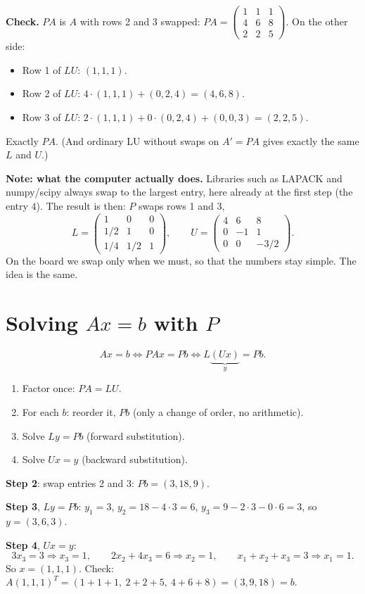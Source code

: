 \textbf{Check.} $PA$ is $A$ with rows 2 and 3 swapped: $PA=\begin{pmatrix}1&1&1\\4&6&8\\2&2&5\end{pmatrix}$. On the other side:
\begin{itemize}
  \item Row 1 of $LU$: $(1,1,1)$.
  \item Row 2 of $LU$: $4\cdot(1,1,1)+(0,2,4) = (4,6,8)$.
  \item Row 3 of $LU$: $2\cdot(1,1,1)+0\cdot(0,2,4)+(0,0,3) = (2,2,5)$.
\end{itemize}
Exactly $PA$. (And ordinary LU without swaps on $A'=PA$ gives exactly the same $L$ and $U$.)

\begin{plainbox}
\textbf{Note: what the computer actually does.} Libraries such as LAPACK and numpy/scipy always swap to the largest entry, here already at the first step
(the entry $4$). The result is then: $P$ swaps rows 1 and 3,
\[ L=\begin{pmatrix}1&0&0\\1/2&1&0\\1/4&1/2&1\end{pmatrix},\qquad U=\begin{pmatrix}4&6&8\\0&-1&1\\0&0&-3/2\end{pmatrix}. \]
On the board we swap only when we must, so that the numbers stay simple. The idea is the same.
\end{plainbox}

\section{Solving $Ax=b$ with $P$}

\[ Ax=b\iff PAx=Pb\iff L\underbrace{(Ux)}_{y}=Pb. \]
\begin{enumerate}
  \item Factor once: $PA=LU$.
  \item For each $b$: reorder it, $Pb$ (only a change of order, no arithmetic).
  \item Solve $Ly=Pb$ (forward substitution).
  \item Solve $Ux=y$ (backward substitution).
\end{enumerate}

\begin{example}[$b=(3,9,18)$]
\textbf{Step 2}: swap entries 2 and 3: $Pb=(3,18,9)$.

\textbf{Step 3}, $Ly=Pb$: $y_1=3$, $y_2=18-4\cdot3=6$, $y_3=9-2\cdot3-0\cdot6=3$, so $y=(3,6,3)$.

\textbf{Step 4}, $Ux=y$:
\[ 3x_3=3\Rightarrow x_3=1,\qquad 2x_2+4x_3=6\Rightarrow x_2=1,\qquad x_1+x_2+x_3=3\Rightarrow x_1=1. \]
So $x=(1,1,1)$. Check: $A(1,1,1)^T=(1+1+1,\ 2+2+5,\ 4+6+8)=(3,9,18)=b$. \checkmark
\end{example}

